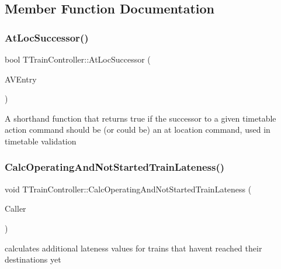 \subsection{Member Function Documentation}
\mbox{\label{class_t_train_controller_a7fbe0dc297130da79bcfa3503c6c51c1}} 
\subsubsection{\texorpdfstring{At\+Loc\+Successor()}{AtLocSuccessor()}}
{\footnotesize\ttfamily bool T\+Train\+Controller\+::\+At\+Loc\+Successor (\begin{DoxyParamCaption}\item[{const \mbox{\hyperlink{class_t_action_vector_entry}{T\+Action\+Vector\+Entry}} \&}]{A\+V\+Entry }\end{DoxyParamCaption})}

A shorthand function that returns true if the successor to a given timetable action command should be (or could be) an \textquotesingle{}at location\textquotesingle{} command, used in timetable validation \mbox{\label{class_t_train_controller_aadffada34a23350d7773bc7735e423a1}} 
\subsubsection{\texorpdfstring{Calc\+Operating\+And\+Not\+Started\+Train\+Lateness()}{CalcOperatingAndNotStartedTrainLateness()}}
{\footnotesize\ttfamily void T\+Train\+Controller\+::\+Calc\+Operating\+And\+Not\+Started\+Train\+Lateness (\begin{DoxyParamCaption}\item[{int}]{Caller }\end{DoxyParamCaption})}

calculates additional lateness values for trains that haven\textquotesingle{}t reached their destinations yet \mbox{\label{class_t_train_controller_ae91c1a77699c9daf327938081eab2241}} 
